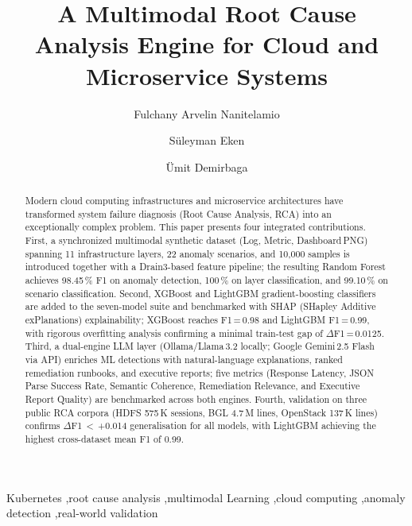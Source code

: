 \documentclass[5p, times]{elsarticle}
\begin{document}
\begin{frontmatter}

\title{A Multimodal Root Cause Analysis Engine for Cloud and Microservice Systems}

\author[inst1]{Fulchany Arvelin Nanitelamio}

\author[inst1]{Süleyman Eken}


\author[inst2]{Ümit Demirbaga}



\begin{abstract}
Modern cloud computing infrastructures and microservice architectures have transformed system failure diagnosis (Root Cause Analysis, RCA) into an exceptionally complex problem. This paper presents four integrated contributions. First, a synchronized multimodal synthetic dataset (Log, Metric, Dashboard\,PNG) spanning 11 infrastructure layers, 22 anomaly scenarios, and 10,000 samples is introduced together with a Drain3-based feature pipeline; the resulting Random Forest achieves 98.45\,\% F1 on anomaly detection, 100\,\% on layer classification, and 99.10\,\% on scenario classification. Second, XGBoost and LightGBM gradient-boosting classifiers are added to the seven-model suite and benchmarked with SHAP (SHapley Additive exPlanations) explainability; XGBoost reaches F1\,=\,0.98 and LightGBM F1\,=\,0.99, with rigorous overfitting analysis confirming a minimal train-test gap of $\Delta$F1\,=\,0.0125. Third, a dual-engine LLM layer (Ollama/Llama\,3.2 locally; Google Gemini\,2.5 Flash via API) enriches ML detections with natural-language explanations, ranked remediation runbooks, and executive reports; five metrics (Response Latency, JSON Parse Success Rate, Semantic Coherence, Remediation Relevance, and Executive Report Quality) are benchmarked across both engines. Fourth, validation on three public RCA corpora (HDFS 575\,K sessions, BGL 4.7\,M lines, OpenStack 137\,K lines) confirms $\Delta$F1\,$<$\,+0.014 generalisation for all models, with LightGBM achieving the highest cross-dataset mean F1 of 0.99.
\end{abstract}

\begin{keyword}
Kubernetes \sep root cause analysis \sep multimodal Learning \sep cloud computing \sep anomaly detection \sep real-world validation
\end{keyword}

\end{frontmatter}
\end{document}
